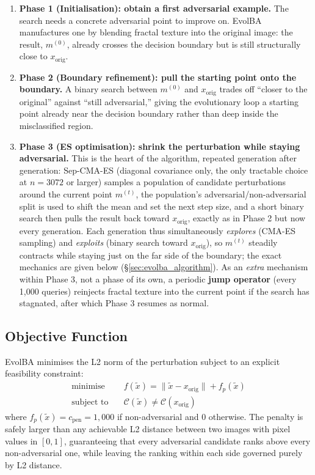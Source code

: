 \documentclass[11pt, a4paper]{article}
\begin{document}
\begin{enumerate}
  \item \textbf{Phase 1 (Initialisation): obtain a first adversarial example.} The search needs a concrete adversarial point to improve on. EvolBA manufactures one by blending fractal texture into the original image: the result, $m^{(0)}$, already crosses the decision boundary but is still structurally close to $x_{\mathrm{orig}}$.

  \item \textbf{Phase 2 (Boundary refinement): pull the starting point onto the boundary.} A binary search between $m^{(0)}$ and $x_{\mathrm{orig}}$ trades off ``closer to the original'' against ``still adversarial,'' giving the evolutionary loop a starting point already near the decision boundary rather than deep inside the misclassified region.

  \item \textbf{Phase 3 (ES optimisation): shrink the perturbation while staying adversarial.} This is the heart of the algorithm, repeated generation after generation: Sep-CMA-ES (diagonal covariance only, the only tractable choice at $n=3072$ or larger) samples a population of candidate perturbations around the current point $m^{(t)}$, the population's adversarial/non-adversarial split is used to shift the mean and set the next step size, and a short binary search then pulls the result back toward $x_{\mathrm{orig}}$, exactly as in Phase 2 but now every generation. Each generation thus simultaneously \emph{explores} (CMA-ES sampling) and \emph{exploits} (binary search toward $x_{\mathrm{orig}}$), so $m^{(t)}$ steadily contracts while staying just on the far side of the boundary; the exact mechanics are given below (\S\ref{sec:evolba_algorithm}). As an \emph{extra} mechanism within Phase 3, not a phase of its own, a periodic \textbf{jump operator} (every 1{,}000 queries) reinjects fractal texture into the current point if the search has stagnated, after which Phase 3 resumes as normal.
\end{enumerate}

\subsection{Objective Function}

EvolBA minimises the L2 norm of the perturbation subject to an explicit feasibility constraint:
\begin{align}
  \text{minimise} \quad & f(\tilde{x}) = \|\tilde{x} - x_{\mathrm{orig}}\| + f_p(\tilde{x}) \label{eq:obj} \\
  \text{subject to} \quad & \mathcal{C}(\tilde{x}) \neq \mathcal{C}(x_{\mathrm{orig}}) \label{eq:constraint}
\end{align}
where $f_p(\tilde{x}) = c_{\mathrm{pen}} = 1{,}000$ if non-adversarial and $0$ otherwise. The penalty is safely larger than any achievable L2 distance between two images with pixel values in $[0,1]$, guaranteeing that every adversarial candidate ranks above every non-adversarial one, while leaving the ranking within each side governed purely by L2 distance.
\end{document}
